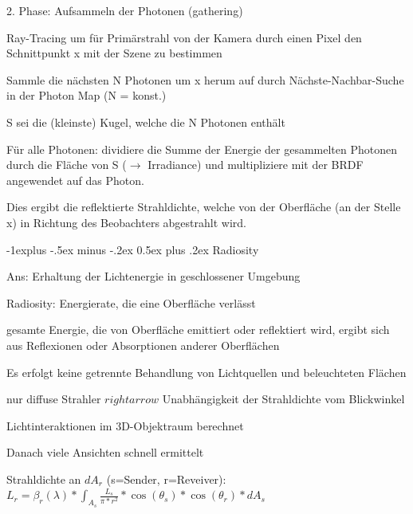 \documentclass[landscape]{article}
\makeatletter
\renewcommand{\subsection}{\@startsection{subsection}{2}{0mm}%
                                {-1explus -.5ex minus -.2ex}%
                                {0.5ex plus .2ex}%
                                {\normalfont\normalsize\bfseries}}
\makeatother
\begin{document}
\begin{multicols}{3}
  2. Phase: Aufsammeln der Photonen (gathering)
  \begin{itemize*}
    \item Ray-Tracing um für Primärstrahl von der Kamera durch einen Pixel den Schnittpunkt x mit der Szene zu bestimmen
    \item Sammle die nächsten N Photonen um x herum auf durch Nächste-Nachbar-Suche in der Photon Map (N = konst.)
    \item S sei die (kleinste) Kugel, welche die N Photonen enthält
    \item Für alle Photonen: dividiere die Summe der Energie der gesammelten Photonen durch die Fläche von S ($\rightarrow$ Irradiance) und multipliziere mit der  BRDF angewendet auf das Photon.
    \item Dies ergibt die reflektierte Strahldichte, welche von der Oberfläche (an der Stelle x) in Richtung des Beobachters abgestrahlt wird.
  \end{itemize*}
  
  \subsection{ Radiosity}
  \begin{itemize*}
    \item Ans: Erhaltung der Lichtenergie in geschlossener Umgebung
    \item Radiosity: Energierate, die eine Oberfläche verlässt %
    \item gesamte Energie, die von Oberfläche emittiert oder reflektiert wird, ergibt sich aus Reflexionen oder Absorptionen anderer Oberflächen
    \item Es erfolgt keine getrennte Behandlung von Lichtquellen und beleuchteten Flächen
    \item nur diffuse Strahler $rightarrow$ Unabhängigkeit der Strahldichte vom Blickwinkel
    \item Lichtinteraktionen im 3D-Objektraum berechnet
    \item Danach viele Ansichten schnell ermittelt %
  \end{itemize*}
  
  Strahldichte an $dA_r$ (s=Sender, r=Reveiver): $L_r=\beta_r(\lambda)*\int_{A_s}\frac{L_s}{\pi * r^2}*\cos(\theta_s)*\cos(\theta_r)*dA_s$
  

\end{multicols}
\end{document}

